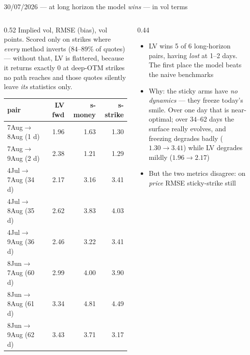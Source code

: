 \documentclass[aspectratio=169,11pt]{beamer}
\newcommand{\gold}[1]{{\color{ntugold}#1}}
\newcommand{\red}[1]{{\color{ntured}#1}}
\begin{document}
\begin{frame}[shrink=6]{30/07/2026 --- at long horizon the model \emph{wins} --- in vol terms}
  \begin{columns}[T]
    \begin{column}{0.52\linewidth}
      \gold{Implied vol, RMSE (bias), vol points.} Scored only on strikes where
      \emph{every} method inverts ($84$--$89\%$ of quotes) --- without that, LV is
      flattered, because it returns exactly $0$ at deep-OTM strikes no path reaches and
      those quotes silently leave \emph{its} statistics only.
      \begin{center}\tiny
      \begin{tabular}{lrrr}
        \toprule
        pair & LV fwd & s-money & s-strike \\
        \midrule
        7Aug$\to$8Aug \gold{(1 d)} & 1.96 & 1.63 & \gold{1.30} \\
        7Aug$\to$9Aug \gold{(2 d)} & 2.38 & \gold{1.21} & 1.29 \\
        \midrule
        4Jul$\to$7Aug (34 d) & \red{2.17} & 3.16 & 3.41 \\
        4Jul$\to$8Aug (35 d) & \red{2.62} & 3.83 & 4.03 \\
        4Jul$\to$9Aug (36 d) & \red{2.46} & 3.22 & 3.41 \\
        8Jun$\to$7Aug (60 d) & \red{2.99} & 4.00 & 3.90 \\
        8Jun$\to$8Aug (61 d) & \red{3.34} & 4.81 & 4.49 \\
        8Jun$\to$9Aug (62 d) & 3.43 & 3.71 & \gold{3.17} \\
        \bottomrule
      \end{tabular}
      \end{center}
    \end{column}
    \begin{column}{0.44\linewidth}
      \begin{itemize}\scriptsize
        \item \red{LV wins 5 of 6 long-horizon pairs}, having \emph{lost} at 1--2 days.
              \gold{The first place the model beats the naive benchmarks}
        \item Why: the sticky arms have \emph{no dynamics} --- they freeze today's smile.
              Over one day that is near-optimal; over $34$--$62$ days the surface really
              evolves, and freezing degrades badly ($1.30\to3.41$) while LV degrades
              mildly ($1.96\to2.17$)
        \item \gold{But the two metrics disagree}: on \emph{price} RMSE sticky-strike still

\end{itemize}
\end{column}
\end{columns}
\end{frame}
\end{document}
